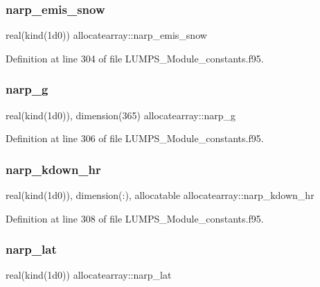 \subsubsection{\texorpdfstring{narp\+\_\+emis\+\_\+snow}{narp\_emis\_snow}}
{\footnotesize\ttfamily real(kind(1d0)) allocatearray\+::narp\+\_\+emis\+\_\+snow}



Definition at line 304 of file L\+U\+M\+P\+S\+\_\+\+Module\+\_\+constants.\+f95.

\mbox{\label{namespaceallocatearray_a8c88a2f2cc3c9a8e17a46321db44dda9}} 
\subsubsection{\texorpdfstring{narp\+\_\+g}{narp\_g}}
{\footnotesize\ttfamily real(kind(1d0)), dimension(365) allocatearray\+::narp\+\_\+g}



Definition at line 306 of file L\+U\+M\+P\+S\+\_\+\+Module\+\_\+constants.\+f95.

\mbox{\label{namespaceallocatearray_a4866b7da54272d82fa9edc9ae61e1ea8}} 
\subsubsection{\texorpdfstring{narp\+\_\+kdown\+\_\+hr}{narp\_kdown\_hr}}
{\footnotesize\ttfamily real(kind(1d0)), dimension(\+:), allocatable allocatearray\+::narp\+\_\+kdown\+\_\+hr}



Definition at line 308 of file L\+U\+M\+P\+S\+\_\+\+Module\+\_\+constants.\+f95.

\mbox{\label{namespaceallocatearray_a7b5080e39a3fff641d0430e27a214f73}} 
\subsubsection{\texorpdfstring{narp\+\_\+lat}{narp\_lat}}
{\footnotesize\ttfamily real(kind(1d0)) allocatearray\+::narp\+\_\+lat}



